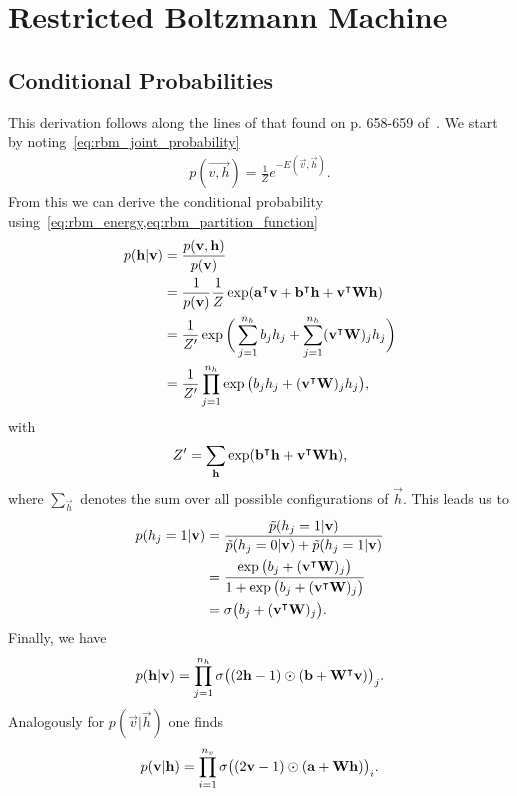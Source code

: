 \chapter{Restricted Boltzmann Machine}
\section{Conditional Probabilities}\label{app:conditional_probabilities_derivation}
This derivation follows along the lines of that found on p. 658-659 of~\cite{goodfellow_deep_learning}.
We start by noting~\cref{eq:rbm_joint_probability}
\begin{align}
    p(\vec{v,h}) = \frac{1}{Z} e^{-E(\vec{v},\vec{h})}.
\end{align}
From this we can derive the conditional probability using~\cref{eq:rbm_energy,eq:rbm_partition_function}
\begin{align}
\begin{split}
    p(\mathbf{h} | \mathbf{v})
        &= \frac{p(\mathbf{v},\mathbf{h})}{p(\mathbf{v})} \\
        &= \frac{1}{p(\mathbf{v})} \frac{1}{Z} \exp( \mathbf{a}^\intercal\mathbf{v} + \mathbf{b}^\intercal\mathbf{h} + \mathbf{v}^\intercal\mathbf{W}\mathbf{h} ) \\
        &= \frac{1}{Z'} \exp\bigg( \sum_{j=1}^{n_h} b_j h_j + \sum_{j=1}^{n_h} (\mathbf{v}^\intercal\mathbf{W})_j h_j \bigg) \\
        &= \frac{1}{Z'} \prod_{j=1}^{n_h} \exp\big( b_j h_j + (\mathbf{v}^\intercal\mathbf{W})_j h_j \big),
\end{split}
\end{align}
with
\begin{align}
    Z' = \sum_{\mathbf{h}} \exp( \mathbf{b}^\intercal\mathbf{h} + \mathbf{v}^\intercal\mathbf{W}\mathbf{h} ),
\end{align}
where \( \sum_{\vec{h}} \) denotes the sum over all possible configurations of \( \vec{h} \).
This leads us to
\begin{align}
\begin{split}
    p(h_j = 1 | \mathbf{v})
        &= \frac{\tilde{p}(h_j = 1 | \mathbf{v})}{\tilde{p}(h_j = 0 | \mathbf{v}) + \tilde{p}(h_j = 1 | \mathbf{v})} \\
        &= \frac{\exp\big( b_j + (\mathbf{v}^\intercal\mathbf{W})_j \big)}{1 + \exp\big( b_j + (\mathbf{v}^\intercal\mathbf{W})_j \big)} \\
        &= \sigma\big( b_j + (\mathbf{v}^\intercal\mathbf{W})_j \big).
\end{split}
\end{align}
Finally, we have
\begin{align}
    p(\mathbf{h} | \mathbf{v}) = \prod_{j=1}^{n_h} \sigma\big( (2\mathbf{h} - 1) \odot (\mathbf{b} + \mathbf{W}^\intercal\mathbf{v}) \big)_j.
\end{align}
Analogously for \( p(\vec{v} | \vec{h}) \) one finds
\begin{align}
    p(\mathbf{v} | \mathbf{h}) = \prod_{i=1}^{n_v} \sigma\big( (2\mathbf{v} - 1) \odot (\mathbf{a} + \mathbf{W}\mathbf{h}) \big)_i.
\end{align}

